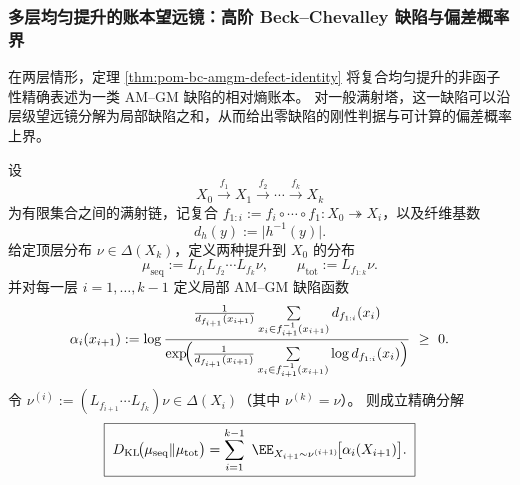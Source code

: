 \subsubsection{多层均匀提升的账本望远镜：高阶 Beck--Chevalley 缺陷与偏差概率界}\label{subsubsec:pom-bc-high-order-ledger}
在两层情形，定理 \ref{thm:pom-bc-amgm-defect-identity} 将复合均匀提升的非函子性精确表述为一类 AM--GM 缺陷的相对熵账本。
对一般满射塔，这一缺陷可以沿层级望远镜分解为局部缺陷之和，从而给出零缺陷的刚性判据与可计算的偏差概率上界。

\begin{theorem}\label{thm:pom-bc-high-order-ledger-decomposition}
设
\[
X_0 \xrightarrow{f_1} X_1 \xrightarrow{f_2} \cdots \xrightarrow{f_k} X_k
\]
为有限集合之间的满射链，记复合 \(f_{1:i}:=f_i\circ\cdots\circ f_1:X_0\twoheadrightarrow X_i\)，以及纤维基数
\[
d_h(y):=\lvert h^{-1}(y)\rvert.
\]
给定顶层分布 \(\nu\in\Delta(X_k)\)，定义两种提升到 \(X_0\) 的分布
\[
\mu_{\mathrm{seq}}:=L_{f_1}L_{f_2}\cdots L_{f_k}\nu,\qquad
\mu_{\mathrm{tot}}:=L_{f_{1:k}}\nu.
\]
并对每一层 \(i=1,\dots,k-1\) 定义局部 AM--GM 缺陷函数
\[
\alpha_i(x_{i+1})
:=
\log\frac{
\frac{1}{d_{f_{i+1}}(x_{i+1})}\sum\limits_{x_i\in f_{i+1}^{-1}(x_{i+1})} d_{f_{1:i}}(x_i)
}{
\exp\!\Bigl(\frac{1}{d_{f_{i+1}}(x_{i+1})}\sum\limits_{x_i\in f_{i+1}^{-1}(x_{i+1})}\log d_{f_{1:i}}(x_i)\Bigr)
}
\ \ge\ 0.
\]
令 \(\nu^{(i)}:=(L_{f_{i+1}}\cdots L_{f_k})\nu\in\Delta(X_i)\)（其中 \(\nu^{(k)}=\nu\)）。
则成立精确分解
\[
\boxed{\;
D_{\mathrm{KL}}\!\bigl(\mu_{\mathrm{seq}}\|\mu_{\mathrm{tot}}\bigr)
=
\sum_{i=1}^{k-1}\ \EE_{X_{i+1}\sim \nu^{(i+1)}}\!\bigl[\alpha_i(X_{i+1})\bigr].
\;}
\]
\end{theorem}
